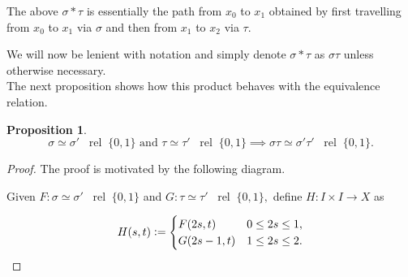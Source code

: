 \documentclass[12pt]{article}
\theoremstyle{definition}
\numberwithin{thm}{section}
\newtheorem{prop}[thm]{Proposition}
\newcommand{\rel}{\;\;\operatorname{rel}\;}
\begin{document}
The above $\sigma*\tau$ is essentially the path from $x_0$ to $x_1$ obtained by first travelling from $x_0$ to $x_1$ via $\sigma$ and then from $x_1$ to $x_2$ via $\tau.$

We will now be lenient with notation and simply denote $\sigma*\tau$ as $\sigma\tau$ unless otherwise necessary.\\
The next proposition shows how this product behaves with the equivalence relation.

\begin{prop}
	\begin{equation*} 
		\sigma \simeq \sigma' \rel \{0, 1\} \text{ and } \tau \simeq \tau' \rel \{0, 1\} \implies \sigma\tau \simeq \sigma'\tau' \rel \{0, 1\}.
	\end{equation*}
\end{prop}
\begin{proof} 
	The proof is motivated by the following diagram.
	
	\begin{center}	
	\end{center}

	Given $F:\sigma \simeq \sigma' \rel \{0, 1\}$ and $G:\tau \simeq \tau' \rel \{0, 1\},$ define $H:I \times I \to X$ as

	\begin{equation*} 
		H(s, t)\vcentcolon= \begin{cases}
				F(2s, t) & 0 \le 2s \le 1,\\
				G(2s - 1, t) & 1 \le 2s \le 2.
			\end{cases}
	\end{equation*}


\end{proof}
\end{document}
